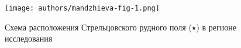 \begin{wrapfigure}{l}{0.5\textwidth}
  \begin{center}
    \texttt{[image: authors/mandzhieva-fig-1.png]}
  \end{center}
  \caption{Схема расположения Стрельцовского рудного поля ($\medblackstar$) в регионе исследования}
  \label{fig:mandzhieva-fig-1}
\end{wrapfigure}

